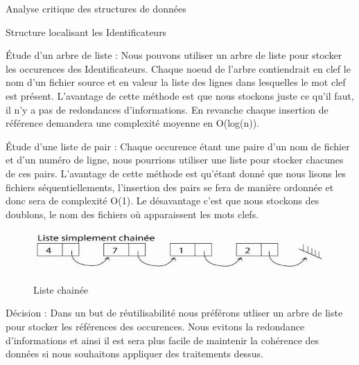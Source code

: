\documentclass{article}
\begin{document}
\begin{section}{Analyse critique des structures de données}
\begin{subsection}{Structure localisant les Identificateurs}
    \begin{paragraph}{Étude d'un arbre de liste :}
    Nous pouvons utiliser un arbre de liste pour stocker les occurences des Identificateurs. Chaque noeud de l'arbre contiendrait en clef le nom d'un fichier source
    et en valeur la liste des lignes dans lesquelles le mot clef est présent. L'avantage de cette méthode est que nous stockons juste ce qu'il faut, il n'y a pas de redondances
    d'informations. En revanche chaque insertion de référence demandera une complexité moyenne en O(log(n)).
  
    \end{paragraph}
    
    \begin{paragraph}{Étude d'une liste de pair :}
      Chaque occurence étant une paire d'un nom de fichier et d'un numéro de ligne, nous pourrions utiliser une liste pour stocker chacunes de ces pairs.
      L'avantage de cette méthode est qu'étant donné que nous lisons les fichiers séquentiellements, l'insertion des pairs se fera de manière ordonnée et donc sera de complexité O(1).
      Le désavantage c'est que nous stockons des doublons, le nom des fichiers où apparaissent les mots clefs.
  
        \begin{figure}[htp]
    \centering
    \includegraphics[scale=0.5]{images/liste.jpg}
    \caption{Liste chainée}
    \end{figure}
    \end{paragraph}
      \FloatBarrier

    \begin{paragraph}{Décision :}
      Dans un but de réutilisabilité nous préférons utliser un arbre de liste pour stocker les références des occurences. Nous evitons la redondance d'informations
      et ainsi il est sera plus facile de maintenir la cohérence des données si nous souhaitons appliquer des traitements dessus.
    \end{paragraph}
    
  \end{subsection}

\end{section}
\end{document}
